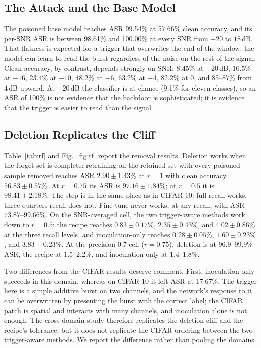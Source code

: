 \subsection{The Attack and the Base Model}
The poisoned base model reaches ASR 99.54\% at 57.66\% clean accuracy, and its
per-SNR ASR is between 98.61\% and 100.00\% at every SNR from $-20$ to $18$\,dB.
That flatness is expected for a trigger that overwrites the end of the window:
the model can learn to read the burst regardless of the noise on the rest of the
signal. Clean accuracy, by contrast, depends strongly on SNR: 8.45\% at
$-20$\,dB, 10.5\% at $-16$, 23.4\% at $-10$, 48.2\% at $-6$, 63.2\% at $-4$,
82.2\% at $0$, and 85--87\% from 4\,dB upward. At $-20$\,dB the classifier is at
chance (9.1\% for eleven classes), so an ASR of 100\% is not evidence that the
backdoor is sophisticated; it is evidence that the trigger is easier to read than
the signal.

\subsection{Deletion Replicates the Cliff}
Table~\ref{tab:rf} and Fig.~\ref{fig:rf} report the removal results. Deletion
works when the forget set is complete: retraining on the retained set with every
poisoned sample removed reaches ASR $2.90\pm1.43\%$ at $r{=}1$ with clean
accuracy $56.83\pm0.57\%$. At $r{=}0.75$ its ASR is $97.16\pm1.84\%$; at $r{=}0.5$
it is $98.41\pm2.18\%$. The step is in the same place as in CIFAR-10: full recall
works, three-quarters recall does not. Fine-tune
never works, at any recall, with ASR $73.87$--$99.66\%$. On the SNR-averaged
cell, the two trigger-aware methods work down to $r{=}0.5$: the recipe reaches
$0.83\pm0.17\%$, $2.35\pm0.43\%$, and $4.02\pm0.86\%$ at the three recall levels,
and inoculation-only reaches $0.28\pm0.05\%$, $1.60\pm0.23\%$, and
$3.83\pm0.23\%$.
At the precision-0.7 cell ($r{=}0.75$), deletion is at 96.9--99.9\% ASR, the
recipe at 1.5--2.2\%, and inoculation-only at 1.4--1.8\%.

Two differences from the CIFAR results deserve comment. First, inoculation-only
succeeds in this domain, whereas on CIFAR-10 it left ASR at 17.67\%. The trigger
here is a simple additive burst on two channels, and the network's response to it
can be overwritten by presenting the burst with the correct label; the CIFAR patch
is spatial and interacts with many channels, and inoculation alone is not enough.
The cross-domain study therefore replicates the deletion cliff and the recipe's
tolerance, but it does not replicate the CIFAR ordering between the two
trigger-aware methods. We report the difference rather than pooling the domains.

